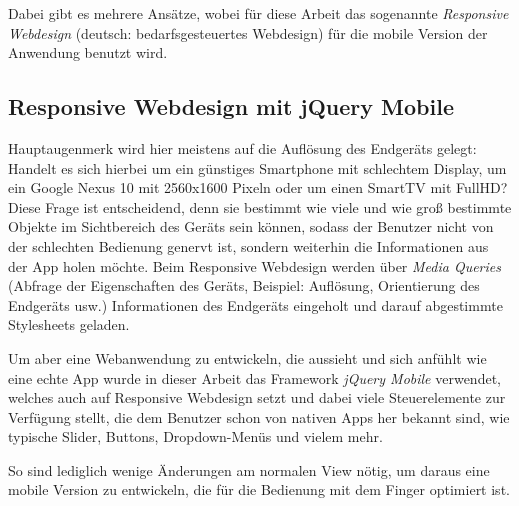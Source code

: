 Dabei gibt es mehrere Ansätze, wobei für diese Arbeit das sogenannte \emph{Responsive Webdesign} (deutsch: bedarfsgesteuertes Webdesign) für die mobile Version der Anwendung benutzt wird.

\subsection{Responsive Webdesign mit jQuery Mobile}
Hauptaugenmerk wird hier meistens auf die Auflösung des Endgeräts gelegt: Handelt es sich hierbei um ein günstiges Smartphone mit schlechtem Display, um ein Google Nexus 10 mit 2560x1600 Pixeln oder um einen SmartTV mit FullHD?\\
Diese Frage ist entscheidend, denn sie bestimmt wie viele und wie groß bestimmte Objekte im Sichtbereich des Geräts sein können, sodass der Benutzer nicht von der schlechten Bedienung genervt ist, sondern weiterhin die Informationen aus der App holen möchte. Beim Responsive Webdesign werden über \emph{Media Queries} (Abfrage der Eigenschaften des Geräts, Beispiel: Auflösung, Orientierung des Endgeräts usw.) Informationen des Endgeräts eingeholt und darauf abgestimmte Stylesheets geladen.\par

Um aber eine Webanwendung zu entwickeln, die aussieht und sich \glqq anfühlt\grqq{} wie eine echte App wurde in dieser Arbeit das Framework \emph{jQuery Mobile} verwendet, welches auch auf Responsive Webdesign setzt und dabei viele Steuerelemente zur Verfügung stellt, die dem Benutzer schon von nativen Apps her bekannt sind, wie typische Slider, Buttons, Dropdown-Menüs und vielem mehr.\par

So sind lediglich wenige Änderungen am normalen View nötig, um daraus eine mobile Version zu entwickeln, die für die Bedienung mit dem Finger optimiert ist.